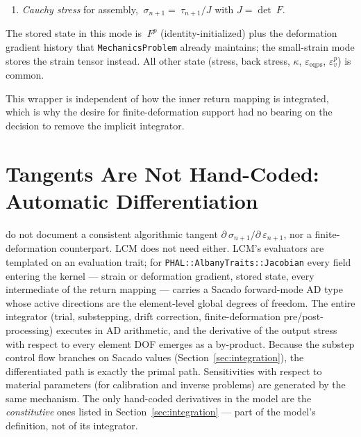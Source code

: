 \documentclass[12pt]{article}
\newcommand{\bcc}{::\allowbreak}
\newcommand{\stress}{~\sigma}
\newcommand{\kirch}{~\tau}
\newcommand{\estrain}{{~\varepsilon^e}}
\newcommand{\Fdef}{~F}
\newcommand{\Fplas}{{~F^p}}
\newcommand{\bee}{{~b^e}}
\newcommand{\Celast}{{~{\mathsf C}^e}}
\begin{document}
\begin{enumerate}
      $\estrain_{n+1} = (\Celast)^{-1}:\kirch_{n+1}$, whence
      \begin{equation}
        \bee_{n+1} = \exp_{\mathrm{sym}}(2\,\estrain_{n+1}),
        \qquad
        ~C_{p,n+1}^{-1} = \Fdef^{-1}\,\bee_{n+1}\,\Fdef^{-\mathrm{T}},
        \qquad
        \Fplas_{n+1} = \bigl(~C_{p,n+1}\bigr)^{1/2},
      \end{equation}
      where the last expression is the symmetric positive-definite
      square root. The rotational part of $\Fplas$ is unobservable in
      an isotropic model, so the symmetric root is a legitimate
      representative; no exponential map of the flow direction is
      formed explicitly --- it is absorbed in the spectral
      $\log$/$\exp$ of $\bee$.
\item \emph{Cauchy stress} for assembly,
      $\stress_{n+1} = \kirch_{n+1}/J$ with $J = \det\Fdef$.
\end{enumerate}
The stored state in this mode is $\Fplas$ (identity-initialized)
plus the deformation gradient history that
\texttt{MechanicsProblem} already maintains; the small-strain mode
stores the strain tensor instead. All other state (stress, back
stress, $\kappa$, $\varepsilon_{\mathrm{eqps}}$, $\varepsilon_v^p$)
is common.

This wrapper is independent of how the inner return mapping is
integrated, which is why the desire for finite-deformation support
had no bearing on the decision to remove the implicit integrator.

\section{Tangents Are Not Hand-Coded: Automatic Differentiation}
\label{sec:ad}

\citet{Sun.Chen.Ostien:2014} do not document a consistent algorithmic
tangent $\partial \stress_{n+1}/\partial ~\varepsilon_{n+1}$, nor a
finite-deformation counterpart. LCM does not need either. LCM's
evaluators are templated on an evaluation trait; for
\texttt{PHAL\bcc AlbanyTraits\bcc Jacobian} every field entering the
kernel --- strain or deformation gradient, stored state, every
intermediate of the return mapping --- carries a Sacado forward-mode
AD type whose active directions are the element-level global degrees
of freedom. The entire integrator (trial, substepping, drift
correction, finite-deformation pre/post-processing) executes in AD
arithmetic, and the derivative of the output stress with respect to
every element DOF emerges as a by-product. Because the substep
control flow branches on Sacado values
(Section~\ref{sec:integration}), the differentiated path is exactly
the primal path. Sensitivities with respect to material parameters
(for calibration and inverse problems) are generated by the same
mechanism. The only hand-coded derivatives in the model are the
\emph{constitutive} ones listed in Section~\ref{sec:integration} ---
part of the model's definition, not of its integrator.
\end{document}
